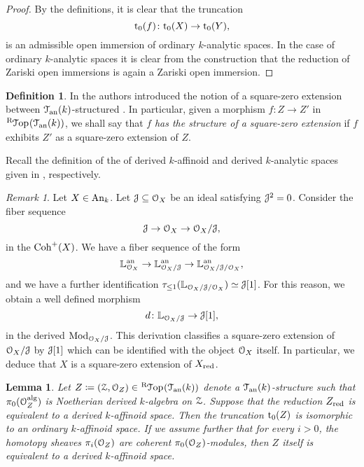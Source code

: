 \documentclass[10pt,a4paper,reqno]{amsart} %
\theoremstyle{plain}
\newtheorem{lem}[thm]{Lemma}
\theoremstyle{definition}
\newtheorem{defin}[thm]{Definition}
\theoremstyle{remark}
\newtheorem{rem}[thm]{Remark}
\numberwithin{equation}{section}
\begin{document}
\begin{proof}
    By the definitions, it is clear that the truncation
        \[
            \mathrm{t}_0(f) \colon \mathrm{t}_0(X) \to \mathrm{t}_0(Y),  
        \]
    is an admissible open immersion of ordinary $k$-analytic spaces. In the case of ordinary $k$-analytic spaces it is clear from the construction
    that the reduction of Zariski open immersions is again a Zariski open immersion.
\end{proof}

\begin{defin}
    In \cite[Definition 5.41]{Porta_Yu_Representability} the authors introduced the notion of a square-zero extension between $\mathcal T_{\mathrm{an}}(k)$-structured
    \inftopoi. In particular, given a morphism $f \colon Z \to Z'$ in $\RTop(\cTank)$, we shall say that $f$ \emph{has the structure of
    a square-zero extension} if $f$ exhibits $Z'$ as a square-zero extension of $Z$.
\end{defin}

Recall the definition of the \infcats of derived $k$-affinoid and derived $k$-analytic spaces given
in \cite[Definition 7.3 and Definition 2.5.]{Porta_Yu_Derived_non-archimedean_analytic_spaces}, respectively.

\begin{rem} \label{rem:construction_of_nilpotent_extensions_as_square_zero_extensions}
    Let $X \in \mathrm{An}_k$. Let $\mathcal J \subseteq \mathcal O_X$ be an ideal satisfying $\mathcal J^2 = 0$. Consider the fiber sequence
        \[
            \mathcal J \to \mathcal O_X \to \mathcal O_X/\mathcal J,  
        \]
    in the \infcat $\mathrm{Coh}^+(X)$. We have a fiber sequence of the form
        \[
            \mathbb L_{\mathcal O_X}^\mathrm{an} \to \mathbb L_{\mathcal O_X / \mathcal J}^\mathrm{an} \to \mathbb L_{\mathcal O_X / \mathcal J / \mathcal O_X}^\mathrm{an},
        \]
    and we have a further identification $\tau_{\le 1} (\mathbb L_{\mathcal O_X/ \mathcal J / \mathcal O_X}) \simeq \mathcal J[1]$. For this reason, we obtain a well defined morphism
        \[
            d \colon \mathbb L_{\mathcal O_X/ \mathcal J} \to \mathcal J[1],
        \]
    in the derived \infcat $\mathrm{Mod}_{\mathcal O_X/ \mathcal J}$. This derivation classifies a square-zero extension of $\mathcal O_X/ \mathcal J$ by $\mathcal J[1]$ which can be identified with the
    object $\mathcal O_X$ itself. In particular, we deduce that $X$ is a square-zero extension of $X_{\mathrm{red}}$.
\end{rem}

\begin{lem} \label{lem:derived_k_analytic_space_whose_reduction_is_affinoid_is_also_affinoid}
    Let $Z \coloneqq (\cZ, \cO_Z) \in \RTop(\cTank)$ denote a $\mathcal T_{\mathrm{an}}(k)$-structure \inftopos such that $\pi_0(\mathcal O_Z^\mathrm{alg}) $ is Noetherian derived $k$-algebra on $\mathcal Z$.
    Suppose that the reduction
    $Z_{\mathrm{red}}$ is equivalent to a derived $k$-affinoid space. Then the truncation $\mathrm{t}_0(Z)$ is isomorphic to an ordinary $k$-affinoid space.
    If we assume further that for every $i>0$, the homotopy sheaves $\pi_i(\mathcal O_Z)$ are
    coherent $\pi_0(\mathcal O_Z)$-modules, then $Z$ itself is equivalent to a derived $k$-affinoid space.
\end{lem}
\end{document}
